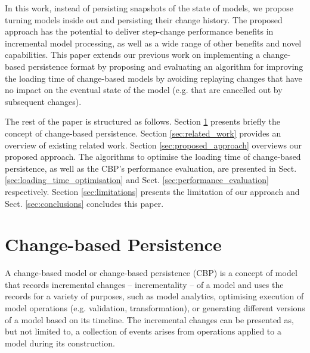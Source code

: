 \documentclass{llncs}
\begin{document}
In this work, instead of persisting snapshots of the state of models, we propose turning models inside out and persisting their change history. The proposed approach has the potential to deliver step-change performance benefits in incremental model processing, as well as a wide range of other benefits and novel capabilities. This paper extends our previous work \cite{yohannis2017turning} on implementing a change-based persistence format by proposing and evaluating an algorithm for improving the loading time of change-based models by avoiding replaying changes that have no impact on the eventual state of the model (e.g. that are cancelled out by subsequent changes).

The rest of the paper is structured as follows. Section \ref{sec:change_based_persistence} presents briefly the concept of change-based persistence. Section \ref{sec:related_work} provides an overview of existing related work. Section \ref{sec:proposed_approach} overviews our proposed approach. The algorithms to optimise the loading time of change-based persistence, as well as the CBP's performance evaluation, are presented in Sect. \ref{sec:loading_time_optimisation} and Sect. \ref{sec:performance_evaluation} respectively. 
Section \ref{sec:limitations} presents the limitation of our approach and Sect. \ref{sec:conclusions} concludes this paper.

\section{Change-based Persistence}
\label{sec:change_based_persistence}
A change-based model or change-based persistence (CBP) is a concept of model that records incremental changes -- incrementality -- of a model and uses the records for a variety of purposes, such as model analytics, optimising execution of model operations (e.g. validation, transformation), or generating different versions of a model based on its timeline. The incremental changes can be presented as, but not limited to, a collection of events arises from operations applied to a model during its construction. 
\end{document}
